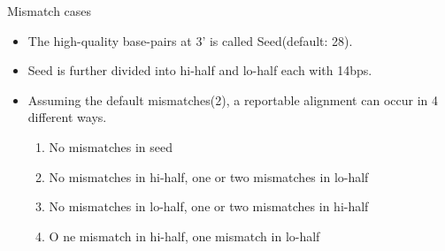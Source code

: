 \documentclass[mathserif]{beamer}
\begin{document}
\begin{frame}{Mismatch cases}
\begin{itemize}
    \item The high-quality base-pairs at 3' is called Seed(default: 28). 
    \item Seed is further divided into hi-half and lo-half each with 14bps.
    \item  Assuming the default mismatches(2), a reportable alignment can occur in 
    4 different ways. 
    \begin{enumerate}
        \item No mismatches in seed
        \item No mismatches in hi-half, one or two mismatches in lo-half
        \item No mismatches in lo-half, one or two mismatches in hi-half
        \item O ne mismatch in hi-half, one mismatch in lo-half
    \end{enumerate} 
\end{itemize}
\end{frame}
\end{document}
